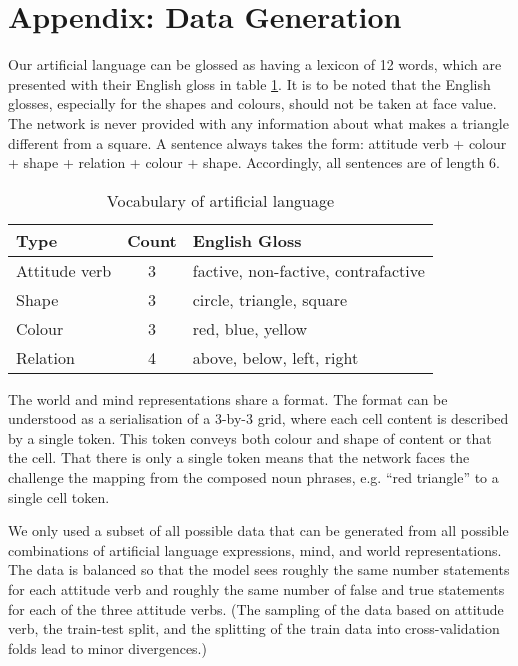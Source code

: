\documentclass[a4paper]{article}
\begin{document}
\section{Appendix: Data Generation}

Our artificial language can be glossed as having a lexicon of 12 words, which are presented with their English gloss in table \ref{tab:artifical_vocabulary}. It is to be noted that the English glosses, especially for the shapes and colours, should not be taken at face value. The network is never provided with any information about what makes a triangle different from a square. A sentence always takes the form: attitude verb + colour + shape + relation + colour + shape. Accordingly, all sentences are of length 6.

\begin{table}[b]
    \centering
    \begin{tabular}{lcl}
        Type & Count & English Gloss \\ \hline
        Attitude verb & 3 & factive, non-factive, contrafactive \\
        Shape & 3 & circle, triangle, square \\
        Colour & 3 & red, blue, yellow \\
        Relation & 4 & above, below, left, right
    \end{tabular}
    \caption{Vocabulary of artificial language}
    \label{tab:artifical_vocabulary}
\end{table}

The world and mind representations share a format. The format can be understood as a serialisation of a 3-by-3 grid, where each cell content is described by a single token. This token conveys both colour and shape of content or that the cell. That there is only a single token means that the network faces the challenge the mapping from the composed noun phrases, e.g. ``red triangle'' to a single cell token.

We only used a subset of all possible data that can be generated from all possible combinations of artificial language expressions, mind, and world representations. The data is balanced so that the model sees roughly the same number statements for each attitude verb and roughly the same number of false and true statements for each of the three attitude verbs. (The sampling of the data based on attitude verb, the train-test split, and the splitting of the train data into cross-validation folds lead to minor divergences.)
\end{document}
